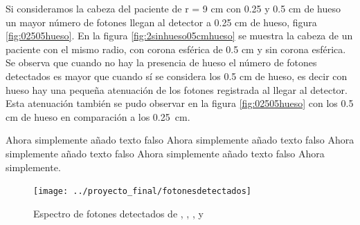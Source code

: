 \documentclass[12pt,a4paper,onecolumn]{article}
\begin{document}
Si consideramos la cabeza del paciente de r = 9 cm con 0.25 y 0.5 cm de hueso un mayor número de fotones llegan al detector a 0.25 cm de hueso, figura \ref{fig:02505hueso}. En la figura \ref{fig:2sinhueso05cmhueso} se muestra la cabeza de un paciente con el mismo radio, con corona esférica de 0.5 cm y sin corona esférica. Se observa que cuando no hay la presencia de hueso el número de fotones detectados es mayor que cuando sí se considera los 0.5 cm de hueso, es decir con hueso hay una pequeña atenuación de los fotones registrada al llegar al detector. Esta atenuación también se pudo observar en la figura \ref{fig:02505hueso} con los 0.5 cm de hueso en comparación a los 0.25~cm.

Ahora simplemente añado texto falso Ahora simplemente añado texto falso Ahora simplemente añado texto falso Ahora simplemente añado texto falso Ahora simplemente.

\begin{figure}[h]
	\centering
	\texttt{[image: ../proyecto\_final/fotonesdetectados]}
	\caption{Espectro de fotones detectados de , , ,  y }
	\label{fig:fotonesdetectados}
\end{figure}
\end{document}
